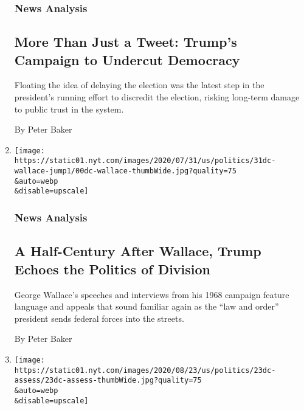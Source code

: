 \begin{enumerate}
  \hypertarget{news-analysis}{%
  \subsubsection{News Analysis}\label{news-analysis}}

  \hypertarget{more-than-just-a-tweet-trumps-campaign-to-undercut-democracy}{%
  \subsection{More Than Just a Tweet: Trump's Campaign to Undercut
  Democracy}\label{more-than-just-a-tweet-trumps-campaign-to-undercut-democracy}}

  Floating the idea of delaying the election was the latest step in the
  president's running effort to discredit the election, risking
  long-term damage to public trust in the system.

  By Peter Baker
\item
  \href{/2020/07/30/us/politics/trump-wallace.html}{}

  \texttt{[image: https://static01.nyt.com/images/2020/07/31/us/politics/31dc-wallace-jump1/00dc-wallace-thumbWide.jpg?quality=75\\\&auto=webp\\\&disable=upscale]}

  \hypertarget{news-analysis-1}{%
  \subsubsection{News Analysis}\label{news-analysis-1}}

  \hypertarget{a-half-century-after-wallace-trump-echoes-the-politics-of-division}{%
  \subsection{A Half-Century After Wallace, Trump Echoes the Politics of
  Division}\label{a-half-century-after-wallace-trump-echoes-the-politics-of-division}}

  George Wallace's speeches and interviews from his 1968 campaign
  feature language and appeals that sound familiar again as the ``law
  and order'' president sends federal forces into the streets.

  By Peter Baker
\item
  \href{/2020/07/24/us/politics/coronavirus-trump-denial.html}{}

  \texttt{[image: https://static01.nyt.com/images/2020/08/23/us/politics/23dc-assess/23dc-assess-thumbWide.jpg?quality=75\\\&auto=webp\\\&disable=upscale]}


\end{enumerate}
